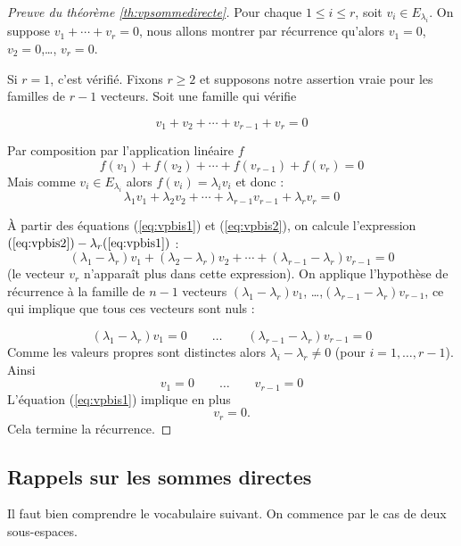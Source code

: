 \documentclass[12pt, class=report,crop=false]{standalone}
\begin{document}
\begin{proof}[Preuve du théorème \ref{th:vpsommedirecte}]
Pour chaque $1\le i\le r$, soit $v_i \in E_{\lambda_i}$. On suppose $v_1+\cdots+v_r=0$, nous allons montrer
par récurrence qu'alors $v_1=0$, $v_2=0$,\ldots, $v_r=0$.

Si $r=1$, c'est vérifié. Fixons $r\ge2$ et supposons notre assertion vraie pour les familles de $r-1$ vecteurs.
Soit une famille qui vérifie 

\begin{equation}
\label{eq:vpbis1}
v_1 + v_2 +\cdots + v_{r-1} + v_r = 0
\end{equation}


Par composition par l'application linéaire $f$
$$f(v_1) + f(v_2) +\cdots + f(v_{r-1}) + f(v_r) = 0 $$
Mais comme $v_i \in E_{\lambda_i}$ alors $f(v_i)=\lambda_i v_i$ et donc :
\begin{equation}
\label{eq:vpbis2}
\lambda_1 v_1 + \lambda_2 v_2 +\cdots + \lambda_{r-1} v_{r-1} + \lambda_r v_r  = 0
\end{equation}

\`A partir des équations (\ref{eq:vpbis1}) et (\ref{eq:vpbis2}), on calcule
l'expression $(\ref{eq:vpbis2}) - \lambda_r (\ref{eq:vpbis1})$ :
\begin{equation}
\label{eq:vpbis3}
(\lambda_1-\lambda_r)  v_1 + (\lambda_2-\lambda_r) v_2 +\cdots + (\lambda_{r-1}-\lambda_{r}) v_{r-1} = 0
\end{equation}
(le vecteur $v_r$ n'apparaît plus dans cette expression).
On applique l'hypothèse de récurrence à la famille de $n-1$ vecteurs $(\lambda_1-\lambda_r)  v_1$,
\ldots,$(\lambda_{r-1}-\lambda_{r}) v_{r-1}$, ce qui implique que tous ces vecteurs sont nuls :

$$(\lambda_1-\lambda_r)  v_1 = 0 \qquad \ldots \qquad (\lambda_{r-1}-\lambda_{r}) v_{r-1}=0$$
Comme les valeurs propres sont distinctes alors $\lambda_i - \lambda_r \neq 0$ (pour $i=1,\ldots,r-1$).
Ainsi 
$$v_1  = 0 \qquad \ldots \qquad v_{r-1} =0$$
L'équation (\ref{eq:vpbis1}) implique en plus
$$v_r = 0.$$
Cela termine la récurrence.
\end{proof}


\subsection{Rappels sur les sommes directes}
\label{ssec:rapsommesdirectes}


Il faut bien comprendre le vocabulaire suivant. On commence par le cas de deux sous-espaces.
\end{document}
